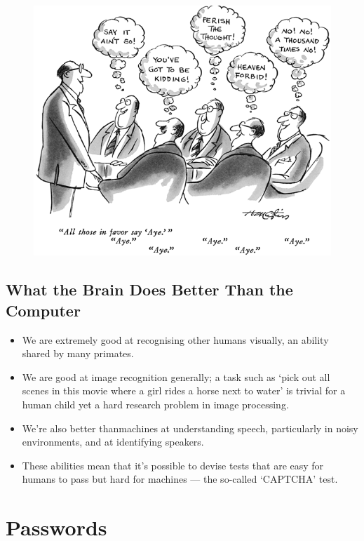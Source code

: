 	\begin{figure}[H]
		\centering
		\includegraphics[scale=0.5]{pics/authority.png}
	\end{figure}


	\subsection*{What the Brain Does Better Than the Computer}
		\begin{itemize}
			\item We are extremely good at recognising other humans visually, an ability shared by 
			many primates.
		
			\item We are good at image recognition generally; a task such as ‘pick out all scenes
			in this movie where a girl rides a horse next to water’ is trivial for a human
			child yet a hard research problem in image processing. 

			\item We’re also better thanmachines at understanding speech, particularly in noisy 
			environments, and at identifying speakers.

			\item These abilities mean that it’s possible to devise tests that are easy for humans
			to pass but hard for machines — the so-called ‘CAPTCHA’ test.
		\end{itemize}

\clearpage
\section{Passwords}

